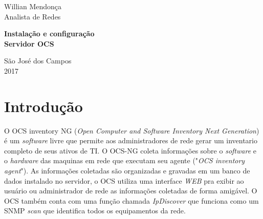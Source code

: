 \documentclass[
               12pt,             %
               a4paper,          %
               chapter=TITLE,    %
               section=TITLE,    %
               english,
               brazil            
]{article}
\begin{document}
\pagestyle{empty} %


\begin{titlepage} 									%

	\begin{center} 									%
		{\large Willian Mendonça}\\[0.2cm] 			%
		{\large Analista de Redes}\\[5.3cm]
	\end{center} 									%
	
	\begin{center} 									%
		{\bf \huge Instalação e configuração}\\[0.2cm]
		{\bf \huge Servidor OCS}\\[13cm] 			%
	\end{center} 									%
	
	\begin{center} 									%
		{\large São José dos Campos}\\[0.2cm]
		{\large 2017}
	\end{center} 									%
	
\end{titlepage} 									%

\pagebreak 											%



\section{Introdução}

O OCS inventory NG (\textit{Open Computer and Software Inventory Next Generation}) é um \textit{software} livre que permite aos administradores de rede gerar um inventario completo de seus ativos de TI. O OCS-NG coleta informações sobre o  \textit{software} e o \textit{hardware} das maquinas em rede que executam seu agente ("\textit{OCS inventory agent}"). As informações coletadas são organizadas e gravadas em um banco de dados instalado no servidor, o OCS utiliza uma interface \textit{WEB} pra exibir ao usuário ou administrador de rede as informações coletadas de forma amigável. O OCS também conta com uma função chamada \textit{IpDiscover} que funciona como um SNMP \textit{scan} que identifica todos os equipamentos da rede.\\
\end{document}
